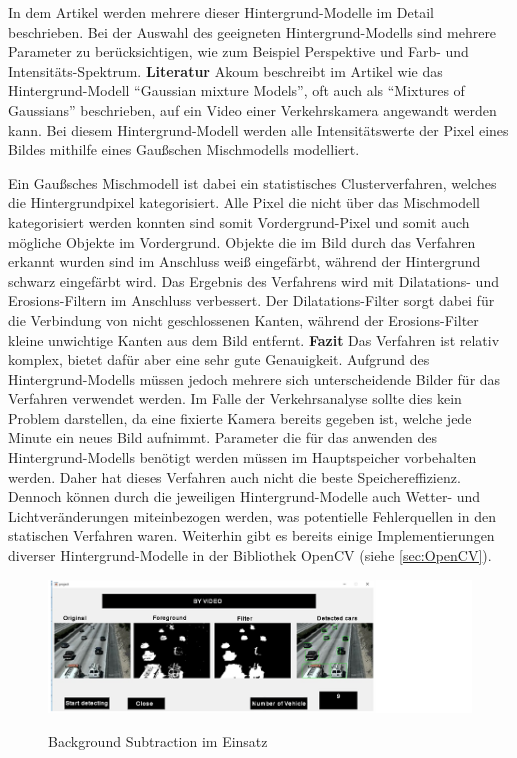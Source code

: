 In dem Artikel \cite{mcivor2000background} werden mehrere dieser Hintergrund-Modelle im Detail beschrieben.
Bei der Auswahl des geeigneten Hintergrund-Modells sind mehrere Parameter zu berücksichtigen, wie zum Beispiel Perspektive und Farb- und Intensitäts-Spektrum.
\newline\newline
\textbf{Literatur}\newline
Akoum beschreibt im Artikel \cite{akoumBSIP} wie das Hintergrund-Modell "`Gaussian mixture Models"', oft auch als "`Mixtures of Gaussians"' beschrieben, auf ein Video einer Verkehrskamera angewandt werden kann.
Bei diesem Hintergrund-Modell werden alle Intensitätswerte der Pixel eines Bildes mithilfe eines Gaußschen Mischmodells modelliert.

Ein Gaußsches Mischmodell ist dabei ein statistisches Clusterverfahren, welches die Hintergrundpixel kategorisiert.
Alle Pixel die nicht über das Mischmodell kategorisiert werden konnten sind somit Vordergrund-Pixel und somit auch mögliche Objekte im Vordergrund.
Objekte die im Bild durch das Verfahren erkannt wurden sind im Anschluss weiß eingefärbt, während der Hintergrund schwarz eingefärbt wird.
Das Ergebnis des Verfahrens wird mit Dilatations- und Erosions-Filtern im Anschluss verbessert. 
Der Dilatations-Filter sorgt dabei für die Verbindung von nicht geschlossenen Kanten, während der Erosions-Filter kleine unwichtige Kanten aus dem Bild entfernt.
\newline\newline
\textbf{Fazit}\newline
Das Verfahren ist relativ komplex, bietet dafür aber eine sehr gute Genauigkeit. 
Aufgrund des Hintergrund-Modells müssen jedoch mehrere sich unterscheidende Bilder für das Verfahren verwendet werden.
Im Falle der Verkehrsanalyse sollte dies kein Problem darstellen, da eine fixierte Kamera bereits gegeben ist, welche jede Minute ein neues Bild aufnimmt.
Parameter die für das anwenden des Hintergrund-Modells benötigt werden müssen im Hauptspeicher vorbehalten werden.
Daher hat dieses Verfahren auch nicht die beste Speichereffizienz.
Dennoch können durch die jeweiligen Hintergrund-Modelle auch Wetter- und Lichtveränderungen miteinbezogen werden, was potentielle Fehlerquellen in den statischen Verfahren waren.
Weiterhin gibt es bereits einige Implementierungen diverser Hintergrund-Modelle in der Bibliothek OpenCV (siehe \ref{sec:OpenCV}).
\begin{figure}[!ht]
   \centering
     \includegraphics[width=15cm]{Bilder/mogpaper} \\
 \caption{Background Subtraction im Einsatz}
 \label{fig:BSSoftware}
\end{figure}
\newpage

